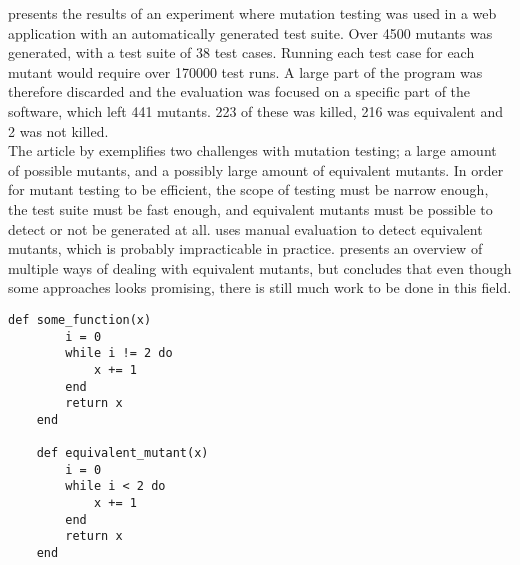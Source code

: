 \citet{article:mutation} presents the results of an experiment where
mutation testing was used in a web application with an automatically
generated test suite. Over 4500 mutants was generated, with a test suite
of 38 test cases. Running each test case for each mutant would require
over 170000 test runs. A large part of the program was therefore
discarded and the evaluation was focused on a specific part of the
software, which left 441 mutants. 223 of these was killed, 216 was
equivalent and 2 was not killed.\\

The article by \citeauthor{article:mutation} exemplifies two challenges
with mutation testing; a large amount of possible mutants, and a
possibly large amount of equivalent mutants. In order for mutant testing
to be efficient, the scope of testing must be narrow enough, the test
suite must be fast enough, and equivalent mutants must be possible to
detect or not be generated at all. \citeauthor{article:mutation} uses
manual evaluation to detect equivalent mutants, which is probably
impracticable in practice. \citet{article:eq_mutant} presents an
overview of multiple ways of dealing with equivalent mutants, but
concludes that even though some approaches looks promising, there is
still much work to be done in this field.\\

\begin{lstlisting}[caption=Example of a program with an equivalent mutant,
                   label=lst:mutation_eq, float=t]
    def some_function(x)
        i = 0
        while i != 2 do
            x += 1
        end
        return x
    end

    def equivalent_mutant(x)
        i = 0
        while i < 2 do
            x += 1
        end
        return x
    end
\end{lstlisting}
